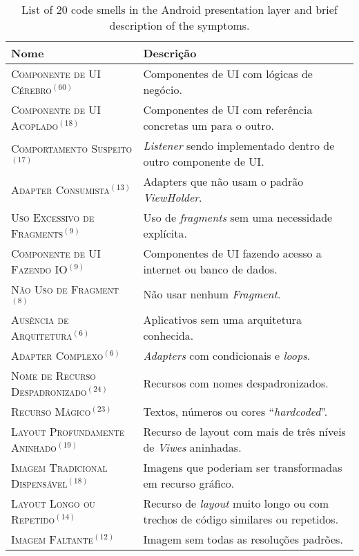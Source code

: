 \begin{table*}[htb!]
\centering
\renewcommand*{\arraystretch}{1}
\caption{List of 20 code smells in the Android presentation layer and brief description of the symptoms.}
\footnotesize
\begin{tabular}{@{}p{6.6cm}@{}p{10cm}@{}}
\toprule
\textbf{Nome} & \textbf{Descrição} \\
\toprule
\textsc{Componente de UI Cérebro}$^{(60)}$            & Componentes de UI com lógicas de negócio.  \\
\textsc{Componente de UI Acoplado}$^{(18)}$           & Componentes de UI com referência concretas um para o outro.  \\
\textsc{Comportamento Suspeito}$^{(17)}$              & \textit{Listener} sendo implementado dentro de outro componente de UI.  \\
\textsc{Adapter Consumista}$^{(13)}$                  & Adapters que não usam o padrão \textit{ViewHolder}.  \\
\textsc{Uso Excessivo de Fragments}$^{(9)}$           & Uso de \textit{fragments} sem uma necessidade explícita. \\
\textsc{Componente de UI Fazendo IO}$^{(9)}$          & Componentes de UI fazendo acesso a internet ou banco de dados.  \\
\textsc{Não Uso de Fragment}$^{(8)}$                  & Não usar nenhum \textit{Fragment}.  \\
\textsc{Ausência de Arquitetura}$^{(6)}$              & Aplicativos sem uma arquitetura conhecida.  \\
\textsc{Adapter Complexo}$^{(6)}$                     & \textit{Adapters} com condicionais e \textit{loops}. \\
\textsc{Nome de Recurso Despadronizado}$^{(24)}$      & Recursos com nomes despadronizados.      \\
\textsc{Recurso Mágico}$^{(23)}$                      & Textos, números ou cores ``\textit{hardcoded}''.   \\
\textsc{Layout Profundamente Aninhado}$^{(19)}$       & Recurso de layout com mais de três níveis de \textit{Viwes} aninhadas.   \\
\textsc{Imagem Tradicional Dispensável}$^{(18)}$      & Imagens que poderiam ser transformadas em recurso gráfico.   \\
\textsc{Layout Longo ou Repetido}$^{(14)}$            & Recurso de \textit{layout} muito longo ou com trechos de código similares ou repetidos.   \\
\textsc{Imagem Faltante}$^{(12)}$                     & Imagem sem todas as resoluções padrões.   \\

\end{tabular}
\end{table*}
